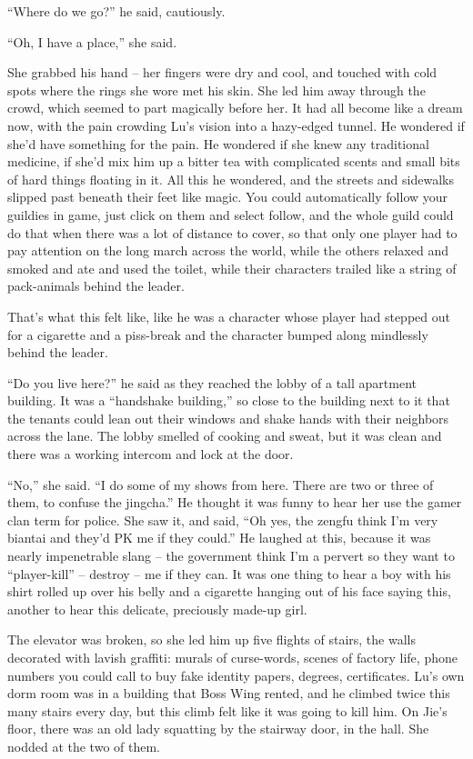 ``Where do we go?'' he said, cautiously.

``Oh, I have a place,'' she said.

She grabbed his hand -- her fingers were dry and cool, and touched
with cold spots where the rings she wore met his skin. She led him
away through the crowd, which seemed to part magically before her.
It had all become like a dream now, with the pain crowding Lu's
vision into a hazy-edged tunnel. He wondered if she'd have
something for the pain. He wondered if she knew any traditional
medicine, if she'd mix him up a bitter tea with complicated scents
and small bits of hard things floating in it. All this he wondered,
and the streets and sidewalks slipped past beneath their feet like
magic. You could automatically follow your guildies in game, just
click on them and select follow, and the whole guild could do that
when there was a lot of distance to cover, so that only one player
had to pay attention on the long march across the world, while the
others relaxed and smoked and ate and used the toilet, while their
characters trailed like a string of pack-animals behind the
leader.

That's what this felt like, like he was a character whose player
had stepped out for a cigarette and a piss-break and the character
bumped along mindlessly behind the leader.

``Do you live here?'' he said as they reached the lobby of a tall
apartment building. It was a ``handshake building,'' so close to the
building next to it that the tenants could lean out their windows
and shake hands with their neighbors across the lane. The lobby
smelled of cooking and sweat, but it was clean and there was a
working intercom and lock at the door.

``No,'' she said. ``I do some of my shows from here. There are two or
three of them, to confuse the jingcha.'' He thought it was funny to
hear her use the gamer clan term for police. She saw it, and said,
``Oh yes, the zengfu think I'm very biantai and they'd PK me if they
could.'' He laughed at this, because it was nearly impenetrable
slang -- the government think I'm a pervert so they want to
``player-kill'' -- destroy -- me if they can. It was one thing to
hear a boy with his shirt rolled up over his belly and a cigarette
hanging out of his face saying this, another to hear this delicate,
preciously made-up girl.

The elevator was broken, so she led him up five flights of stairs,
the walls decorated with lavish graffiti: murals of curse-words,
scenes of factory life, phone numbers you could call to buy fake
identity papers, degrees, certificates. Lu's own dorm room was in a
building that Boss Wing rented, and he climbed twice this many
stairs every day, but this climb felt like it was going to kill
him. On Jie's floor, there was an old lady squatting by the
stairway door, in the hall. She nodded at the two of them.

